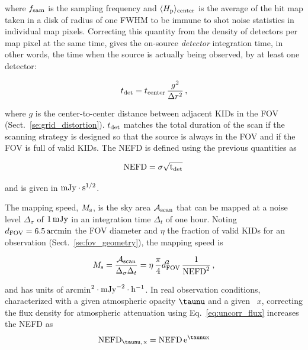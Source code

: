 where $f_{\rm{sam}}$ is the sampling frequency and $\langle
H_{\rm{p}}\rangle_{\rm{center}}$ is the average of the hit map taken in a disk
of radius of one FWHM to be immune to shot noise statistics in individual map
pixels. Correcting this quantity from the density of detectors per map pixel at
the same time, gives the on-source \emph{detector} integration time, in other
words, the time when the source is actually being observed, by at least one
detector:

\begin{equation}
  t_{\rm{det}} = t_{\rm{center}}\, \frac{g^2}{\Delta r^2}\,,
\label{eq:t_det}
\end{equation}

where $g$ is the center-to-center distance between adjacent KIDs in the FOV
(Sect.~\ref{se:grid_distortion}). $t_{\rm{det}}$ matches the total duration of
the scan if the scanning strategy is designed so that the source is always in
the FOV and if the FOV is full of valid KIDs. The NEFD is defined
using the previous quantities as 

\begin{equation}
  \rm{NEFD} = \sigma \sqrt{t_{\rm{det}}}\, 
\label{eq:nefd_def}
\end{equation}

and is given in $\rm{mJy}\cdot s^{1/2}$.

The mapping speed, $M_{\rm{s}}$, is the sky area $\mathcal{A}_{\rm{scan}}$ that
can be mapped at a noise level $\Delta_\sigma$ of $1\,\rm{mJy}$ in an
integration time $\Delta_t$ of one hour. Noting $d_{\rm{FOV}} =
6.5\,\rm{arcmin}$ the FOV diameter and $\eta$ the fraction of valid KIDs for an
observation (Sect.~\ref{se:fov_geometry}), the mapping speed is

\begin{equation}
M_{\rm{s}} = \frac{\mathcal{A}_{\rm{scan}}}{\Delta_\sigma\Delta_t} = 
\eta \, \frac{\pi}{4} d_{\rm{FOV}}^2 \, \frac{1}{\rm{NEFD}^2}\, ,
\label{eq:mapping_speed}
\end{equation}

and has units of arcmin$^2 \cdot \rm{mJy}^{-2} \cdot \rm{h}^{-1}$. 
In real observation conditions, characterized with a given atmospheric
opacity $\taunu$ and a given \airmass\ $x$, correcting the flux
density for atmospheric attenuation using Eq.~\ref{eq:uncorr_flux}   
increases the NEFD as 
\begin{equation}
\rm{NEFD}_{\taunu,\, x} = \rm{NEFD}\, e^{\taunu x}
\label{eq:nefd_tau_el}
\end{equation}

